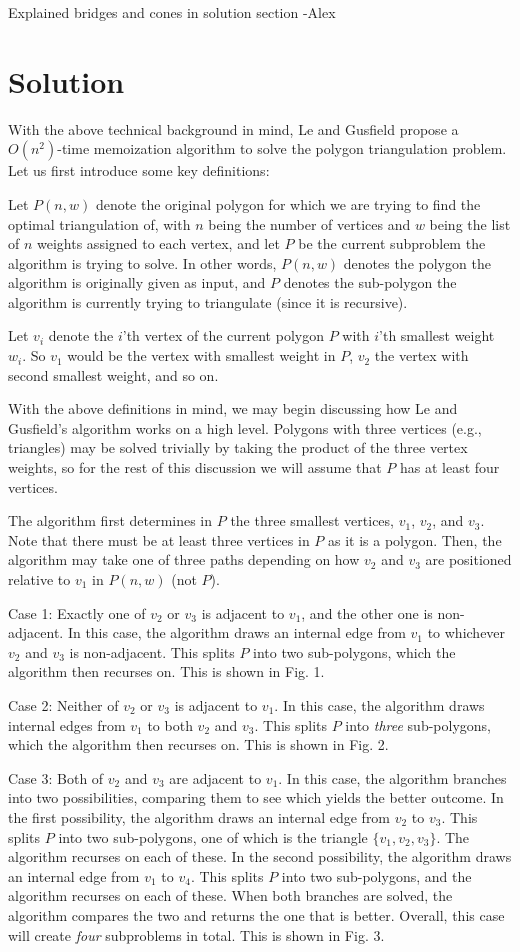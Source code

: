 \documentclass[12pt]{article}
\begin{document}
 Explained bridges and cones in solution section -Alex
\section{Solution}
With the above technical background in mind, Le and Gusfield propose a $O(n^2)$-time memoization algorithm to solve the polygon triangulation problem. Let us first introduce some key definitions:

Let $P(n, w)$ denote the original polygon for which we are trying to find the optimal triangulation of, with $n$ being the number of vertices and $w$ being the list of $n$ weights assigned to each vertex, and let $P$ be the current subproblem the algorithm is trying to solve. In other words, $P(n,w)$ denotes the polygon the algorithm is originally given as input, and $P$ denotes the sub-polygon the algorithm is currently trying to triangulate (since it is recursive). 

Let $v_i$ denote the $i$'th vertex of the current polygon $P$ with $i$'th smallest weight $w_i$. So $v_1$ would be the vertex with smallest weight in $P$, $v_2$ the vertex with second smallest weight, and so on.

With the above definitions in mind, we may begin discussing how Le and Gusfield's algorithm works on a high level. Polygons with three vertices (e.g., triangles) may be solved trivially by taking the product of the three vertex weights, so for the rest of this discussion we will assume that $P$ has at least four vertices.

The algorithm first determines in $P$ the three smallest vertices, $v_1$, $v_2$, and $v_3$. Note that there must be at least three vertices in $P$ as it is a polygon. Then, the algorithm may take one of three paths depending on how $v_2$ and $v_3$ are positioned relative to $v_1$ in $P(n,w)$ (not $P$).

Case 1: Exactly one of $v_2$ or $v_3$ is adjacent to $v_1$, and the other one is non-adjacent. In this case, the algorithm draws an internal edge from $v_1$ to whichever $v_2$ and $v_3$ is non-adjacent. This splits $P$ into two sub-polygons, which the algorithm then recurses on. This is shown in Fig. 1.

Case 2: Neither of $v_2$ or $v_3$ is adjacent to $v_1$. In this case, the algorithm draws internal edges from $v_1$ to both $v_2$ and $v_3$. This splits $P$ into \textit{three} sub-polygons, which the algorithm then recurses on. This is shown in Fig. 2.

Case 3: Both of $v_2$ and $v_3$ are adjacent to $v_1$. In this case, the algorithm branches into two possibilities, comparing them to see which yields the better outcome. In the first possibility, the algorithm draws an internal edge from $v_2$ to $v_3$. This splits $P$ into two sub-polygons, one of which is the triangle $\{v_1, v_2, v_3\}$. The algorithm recurses on each of these. In the second possibility, the algorithm draws an internal edge from $v_1$ to $v_4$. This splits $P$ into two sub-polygons, and the algorithm recurses on each of these. When both branches are solved, the algorithm compares the two and returns the one that is better. Overall, this case will create \textit{four} subproblems in total. This is shown in Fig. 3.
\end{document}
